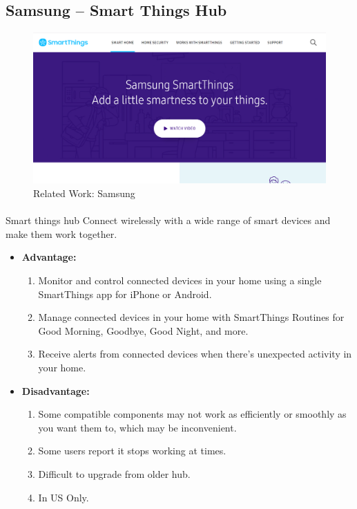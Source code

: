 \documentclass[12pt, oneside, a4paper]{book}
\newcommand\boldcolor[1]{\textcolor{bold}{\textbf{#1}}}
\begin{document}
		\subsection{Samsung – Smart Things Hub}
		\begin{figure}[H]
  			\caption{Related Work: Samsung}
			\includegraphics[width=\linewidth]{img/samsung.png}
		\end{figure}
		\paragraph{}Smart things hub Connect wirelessly with a wide range of smart devices and make them work together\cite{samsung}.
		\begin{itemize}
			\item \boldcolor{Advantage:}
			\begin{enumerate}
				\item Monitor and control connected devices in your home using a single SmartThings app for iPhone or Android.
				\item Manage connected devices in your home with SmartThings Routines for Good Morning, Goodbye, Good Night, and more.
				\item Receive alerts from connected devices when there’s unexpected activity in your home.
				
			\end{enumerate}
			\item \boldcolor{Disadvantage:} 
			\begin{enumerate}
				\item Some compatible components may not work as efficiently or smoothly as you want them to, which may be inconvenient.
				\item Some users report it stops working at times.
				\item Difficult to upgrade from older hub.
				\item In US Only.
			\end{enumerate}
		\end{itemize}
\end{document}
